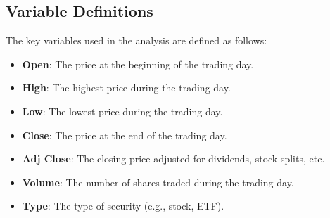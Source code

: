\subsection{Variable Definitions}
The key variables used in the analysis are defined as follows:
\begin{itemize}
    \item \textbf{Open}: The price at the beginning of the trading day.
    \item \textbf{High}: The highest price during the trading day.
    \item \textbf{Low}: The lowest price during the trading day.
    \item \textbf{Close}: The price at the end of the trading day.
    \item \textbf{Adj Close}: The closing price adjusted for dividends, stock splits, etc.
    \item \textbf{Volume}: The number of shares traded during the trading day.
    \item \textbf{Type}: The type of security (e.g., stock, ETF).
\end{itemize}

\newpage
